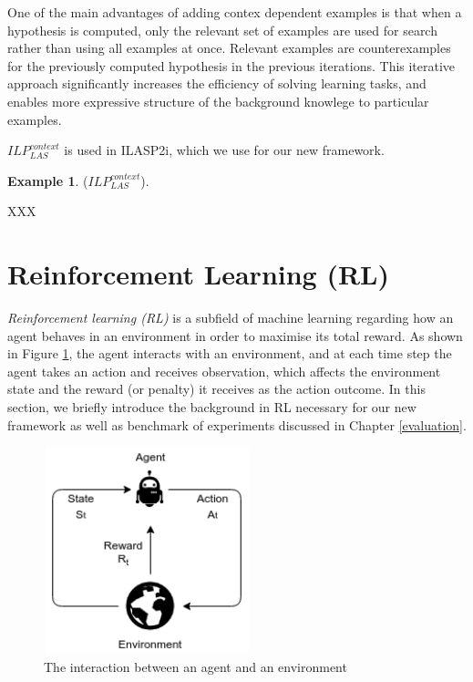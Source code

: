 \documentclass[12pt,twoside]{report}
\theoremstyle{plain}
\theoremstyle{definition}
\newtheorem{examp}{Example}[section]
\begin{document}
One of the main advantages of adding contex dependent examples is that when a hypothesis is computed, only the relevant set of examples are used for search rather than using all examples at once. Relevant examples are counterexamples for the previously computed hypothesis in the previous iterations. This iterative approach significantly increases the efficiency of solving learning tasks, and enables more expressive structure of the background knowlege to particular examples. 

$ILP_{LAS}^{context}$ is used in ILASP2i, which we use for our new framework.


\begin{examp} \normalfont ($ILP_{LAS}^{context}$).

XXX
\end{examp}

\section{Reinforcement Learning (RL)}
\label{rl}
\textit{Reinforcement learning (RL)} is a subfield of machine learning regarding how an agent behaves in an environment in order to maximise its total reward. As shown in Figure \ref{agent_env}, the agent interacts with an environment, and at each time step the agent takes an action and receives observation, which affects the environment state and the reward (or penalty) it receives as the action outcome. In this section, we briefly introduce the background in RL necessary for our new framework as well as benchmark of experiments discussed in Chapter \ref{evaluation}.

\begin{figure}[!htb]
\centering
\includegraphics[width=6cm, height=6cm]{./figures/agent_env}
\caption{The interaction between an agent and an environment}
\label{agent_env}
\end{figure}
\end{document}
